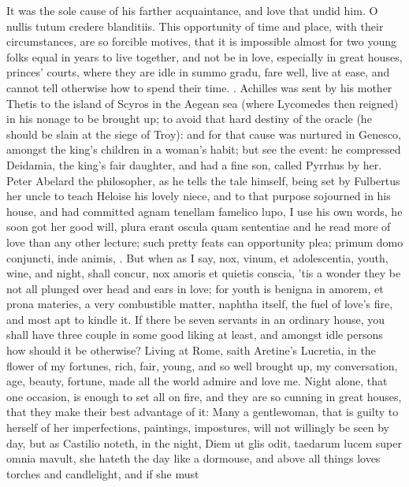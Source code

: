 {It was the sole cause of his farther acquaintance, and love that undid
him. O nullis tutum credere blanditiis.
This opportunity of time and place, with their circumstances, are so
forcible motives, that it is impossible almost for two young folks
equal in years to live together, and not be in love, especially in
great houses, princes' courts, where they are idle in summo gradu, fare
well, live at ease, and cannot tell otherwise how to spend their time.
. Achilles was sent by his
mother Thetis to the island of Scyros in the Aegean sea (where
Lycomedes then reigned) in his nonage to be brought up; to avoid that
hard destiny of the oracle (he should be slain at the siege of Troy):
and for that cause was nurtured in Genesco, amongst the king's children
in a woman's habit; but see the event: he compressed Deidamia, the
king's fair daughter, and had a fine son, called Pyrrhus by her. Peter
Abelard the philosopher, as he tells the tale himself, being set by
Fulbertus her uncle to teach Heloise his lovely niece, and to that
purpose sojourned in his house, and had committed agnam tenellam
famelico lupo, I use his own words, he soon got her good will, plura
erant oscula quam sententiae and he read more of love than any other
lecture; such pretty feats can opportunity plea; primum domo conjuncti,
inde animis, \etc{}. But when as I say, nox, vinum, et adolescentia, youth,
wine, and night, shall concur, nox amoris et quietis conscia, 'tis a
wonder they be not all plunged over head and ears in love; for youth is
benigna in amorem, et prona materies, a very combustible matter,
naphtha itself, the fuel of love's fire, and most apt to kindle it. If
there be seven servants in an ordinary house, you shall have three
couple in some good liking at least, and amongst idle persons how
should it be otherwise? Living at Rome, saith Aretine's Lucretia,
in the flower of my fortunes, rich, fair, young, and so well brought
up, my conversation, age, beauty, fortune, made all the world admire
and love me. Night alone, that one occasion, is enough to set all on
fire, and they are so cunning in great houses, that they make their
best advantage of it: Many a gentlewoman, that is guilty to herself of
her imperfections, paintings, impostures, will not willingly be seen by
day, but as Castilio noteth, in the night, Diem ut glis odit,
taedarum lucem super omnia mavult, she hateth the day like a dormouse,
and above all things loves torches and candlelight, and if she must
}
